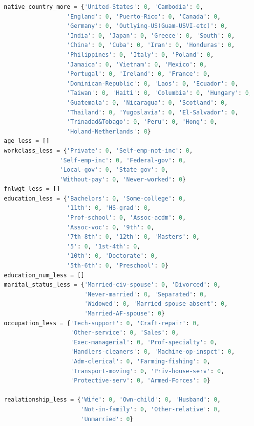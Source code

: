﻿\documentclass[a4paper, 11pt]{article}
\begin{document}
\begin{lstlisting}[language=Python,frame=single]
native_country_more = {'United-States': 0, 'Cambodia': 0,
                  'England': 0, 'Puerto-Rico': 0, 'Canada': 0,
                  'Germany': 0, 'Outlying-US(Guam-USVI-etc)': 0,
                  'India': 0, 'Japan': 0, 'Greece': 0, 'South': 0,
                  'China': 0, 'Cuba': 0, 'Iran': 0, 'Honduras': 0,
                  'Philippines': 0, 'Italy': 0, 'Poland': 0,
                  'Jamaica': 0, 'Vietnam': 0, 'Mexico': 0,
                  'Portugal': 0, 'Ireland': 0, 'France': 0,
                  'Dominican-Republic': 0, 'Laos': 0, 'Ecuador': 0,
                  'Taiwan': 0, 'Haiti': 0, 'Columbia': 0, 'Hungary': 0,
                  'Guatemala': 0, 'Nicaragua': 0, 'Scotland': 0,
                  'Thailand': 0, 'Yugoslavia': 0, 'El-Salvador': 0,
                  'Trinadad&Tobago': 0, 'Peru': 0, 'Hong': 0,
                  'Holand-Netherlands': 0}
age_less = []
workclass_less = {'Private': 0, 'Self-emp-not-inc': 0,
                'Self-emp-inc': 0, 'Federal-gov': 0,
                'Local-gov': 0, 'State-gov': 0,
                'Without-pay': 0, 'Never-worked': 0}
fnlwgt_less = []
education_less = {'Bachelors': 0, 'Some-college': 0,
                  '11th': 0, 'HS-grad': 0,
                  'Prof-school': 0, 'Assoc-acdm': 0,
                  'Assoc-voc': 0, '9th': 0,
                  '7th-8th': 0, '12th': 0, 'Masters': 0,
                  '5': 0, '1st-4th': 0,
                  '10th': 0, 'Doctorate': 0,
                  '5th-6th': 0, 'Preschool': 0}
education_num_less = []
marital_status_less = {'Married-civ-spouse': 0, 'Divorced': 0,
                       'Never-married': 0, 'Separated': 0,
                       'Widowed': 0, 'Married-spouse-absent': 0,
                       'Married-AF-spouse': 0}
occupation_less = {'Tech-support': 0, 'Craft-repair': 0,
                   'Other-service': 0, 'Sales': 0,
                   'Exec-managerial': 0, 'Prof-specialty': 0,
                   'Handlers-cleaners': 0, 'Machine-op-inspct': 0,
                   'Adm-clerical': 0, 'Farming-fishing': 0,
                   'Transport-moving': 0, 'Priv-house-serv': 0,
                   'Protective-serv': 0, 'Armed-Forces': 0}

realationship_less = {'Wife': 0, 'Own-child': 0, 'Husband': 0,
                      'Not-in-family': 0, 'Other-relative': 0,
                      'Unmarried': 0}


\end{lstlisting}
\end{document}
